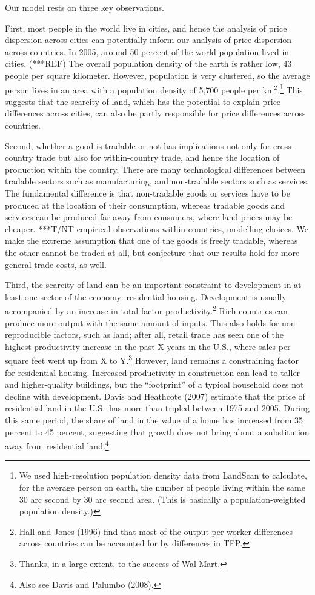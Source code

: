 \documentclass[12pt]{article}
\begin{document}
Our model rests on three key observations. 

First, most people in the world live in cities, and hence the analysis of price dispersion across cities can potentially inform our analysis of price dispersion across countries. In 2005, around 50 percent of the world population lived in cities. (***REF) The overall population density of the earth is rather low, 43 people per square kilometer.  However, population is very clustered, so the average person lives in an area with a population density of 5,700 people per km${}^2$.\footnote{We used high-resolution population density data from LandScan to calculate, for the average person on earth, the number of people living within the same 30 arc second by 30 arc second area. (This is basically a population-weighted population density.) } This suggests that the scarcity of land, which has the potential to explain price differences across cities, can also be partly responsible for price differences across countries.

Second, whether a good is tradable or not has implications not only for cross-country trade but also for within-country trade, and hence the location of production within the country. There are many technological differences between tradable sectors such as manufacturing, and non-tradable sectors such as services. The fundamental difference is that non-tradable goods or services have to be produced at the location of their consumption, whereas tradable goods and services can be produced far away from consumers, where land prices may be cheaper. ***T/NT empirical observations within countries, modelling choices.  We make the extreme assumption that one of the goods is freely tradable, whereas the other cannot be traded at all, but conjecture that our results hold for more general trade costs, as well.

Third, the scarcity of land can be an important constraint to development in at least one sector of the economy: residential housing. Development is usually accompanied by an increase in total factor productivity.\footnote{Hall and Jones (1996) find that most of the output per worker differences across countries can be accounted for by differences in TFP.} Rich countries can produce more output with the same amount of inputs. This also holds for non-reproducible factors, such as land; after all, retail trade has seen one of the highest productivity increase in the past X years in the U.S., where sales per square feet went up from X to Y.\footnote{Thanks, in a large extent, to the success of Wal Mart.} However, land remains a constraining factor for residential housing. Increased productivity in construction can lead to taller and higher-quality buildings, but the ``footprint'' of a typical household does not decline with development. Davis and Heathcote (2007) estimate that the price of residential land in the U.S.~has more than tripled between 1975 and 2005. During this same period, the share of land in the value of a home has increased from 35 percent to 45 percent, suggesting that growth does not bring about a substitution away from residential land.\footnote{Also see Davis and Palumbo (2008).}
\end{document}
